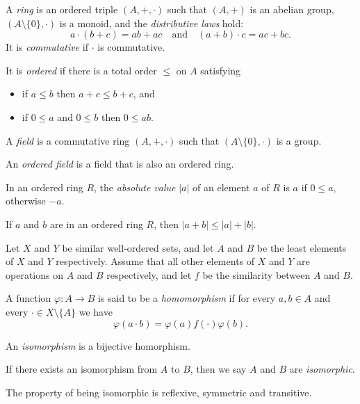   \begin{defn}
    A \emph{ring} is an ordered triple $(A,+,\cdot)$ such that $(A,+)$ is an
    abelian group, $(A\setminus \{0\},\cdot)$ is a monoid, and the
    \emph{distributive laws} hold:
    \[a\cdot(b+c)=ab+ac\quad\text{and}\quad (a+b)\cdot c=ac+bc.\]
    It is \emph{commutative} if $\cdot$ is commutative.

    It is \emph{ordered} if there is a total order $\le$ on $A$ satisfying
    \begin{itemize}
      \item if $a\le b$ then $a+c\le b+c$, and
      \item if $0\le a$ and $0\le b$ then $0\le ab$.
    \end{itemize}
  \end{defn}
  \begin{defn}
    A \emph{field} is a commutative ring $(A,+,\cdot)$ such that $(A\setminus
    \{0\},\cdot)$ is a group.

    An \emph{ordered field} is a field that is also an ordered ring.
  \end{defn}
  \begin{defn}
    In an ordered ring $R$, the \emph{absolute value} $|a|$ of an element $a$
    of $R$ is $a$ if $0\le a$, otherwise $-a$.
  \end{defn}
  \begin{prop}
    If $a$ and $b$ are in an ordered ring $R$, then $|a+b|\le|a|+|b|$.
  \end{prop}
  \begin{defn}
    Let $X$ and $Y$ be similar well-ordered sets, and let $A$ and $B$ be the
    least elements of $X$ and $Y$ respectively. Assume that all other elements
    of $X$ and $Y$ are operations on $A$ and $B$ respectively, and let $f$ be
    the similarity between $A$ and $B$.

    A function $\varphi:A\to B$ is said
    to be a \emph{homomorphism} if
    for every $a,b\in A$ and every $\cdot\in X\setminus \{A\}$ we
    have \[\varphi(a\cdot b)=\varphi(a) f(\cdot) \varphi(b).\]

    An \emph{isomorphism} is a bijective homorphism.

    If there exists an isomorphism from $A$ to $B$, then we say $A$ and $B$ are
    \emph{isomorphic}.
  \end{defn}
  \begin{prop}
    The property of being isomorphic is reflexive, symmetric and transitive.
  \end{prop}
